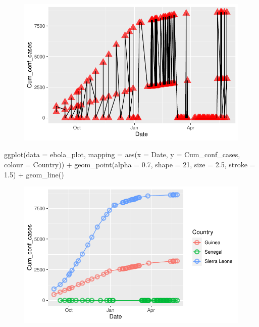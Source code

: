 \documentclass[
  letterpaper,
  DIV=11,
  numbers=noendperiod]{scrartcl}
\newenvironment{Shaded}{\begin{snugshade}}{\end{snugshade}}
\newcommand{\AttributeTok}[1]{\textcolor[rgb]{0.40,0.45,0.13}{#1}}
\newcommand{\DecValTok}[1]{\textcolor[rgb]{0.68,0.00,0.00}{#1}}
\newcommand{\FloatTok}[1]{\textcolor[rgb]{0.68,0.00,0.00}{#1}}
\newcommand{\FunctionTok}[1]{\textcolor[rgb]{0.28,0.35,0.67}{#1}}
\newcommand{\NormalTok}[1]{\textcolor[rgb]{0.00,0.23,0.31}{#1}}
\newcommand{\SpecialCharTok}[1]{\textcolor[rgb]{0.37,0.37,0.37}{#1}}
\begin{document}
\begin{figure}[H]

{\centering \includegraphics{Day2_script_20230606_files/figure-pdf/unnamed-chunk-2-1.pdf}

}

\end{figure}

\begin{Shaded}
\begin{Highlighting}[]
  \FunctionTok{ggplot}\NormalTok{(}\AttributeTok{data =}\NormalTok{ ebola\_plot, }
                  \AttributeTok{mapping =} \FunctionTok{aes}\NormalTok{(}\AttributeTok{x =}\NormalTok{ Date, }\AttributeTok{y =}\NormalTok{ Cum\_conf\_cases, }\AttributeTok{colour =}\NormalTok{ Country)) }\SpecialCharTok{+} 
    \FunctionTok{geom\_point}\NormalTok{(}\AttributeTok{alpha =} \FloatTok{0.7}\NormalTok{, }\AttributeTok{shape =} \DecValTok{21}\NormalTok{, }\AttributeTok{size =} \FloatTok{2.5}\NormalTok{, }\AttributeTok{stroke =} \FloatTok{1.5}\NormalTok{) }\SpecialCharTok{+}
    \FunctionTok{geom\_line}\NormalTok{()}
\end{Highlighting}
\end{Shaded}

\begin{figure}[H]

{\centering \includegraphics{Day2_script_20230606_files/figure-pdf/unnamed-chunk-2-2.pdf}

}

\end{figure}
\end{document}
